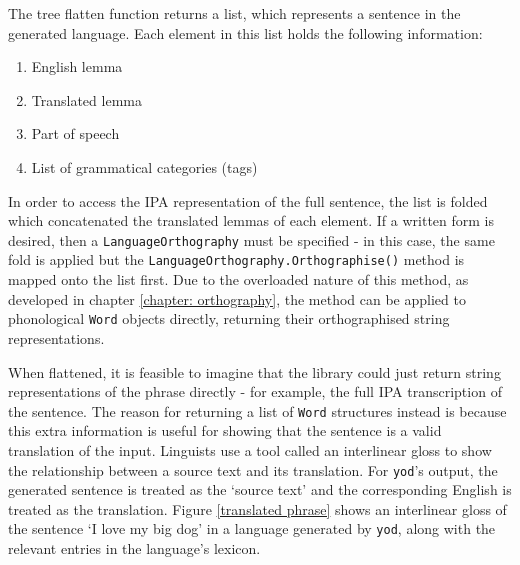 \documentclass{report}
\begin{document}
	The tree flatten function returns a list, which represents a sentence in the generated language. Each element in this list holds the following information:
	\begin{enumerate}
		\item English lemma
		\item Translated lemma
		\item Part of speech
		\item List of grammatical categories (tags)
	\end{enumerate}

	In order to access the IPA representation of the full sentence, the list is folded which concatenated the translated lemmas of each element. If a written form is desired, then a \texttt{LanguageOrthography} must be specified - in this case, the same fold is applied but the \texttt{LanguageOrthography.Orthographise()} method is mapped onto the list first. Due to the overloaded nature of this method, as developed in chapter \ref{chapter: orthography}, the method can be applied to phonological \texttt{Word} objects directly, returning their orthographised string representations.

	When flattened, it is feasible to imagine that the library could just return string representations of the phrase directly - for example, the full IPA transcription of the sentence. The reason for returning a list of \texttt{Word} structures instead is because this extra information is useful for showing that the sentence is a valid translation of the input. Linguists use a tool called an interlinear gloss to show the relationship between a source text and its translation\cite{bickel2008leipzig}. For \texttt{yod}'s output, the generated sentence is treated as the `source text' and the corresponding English is treated as the translation. Figure \ref{translated phrase} shows an interlinear gloss of the sentence `I love my big dog' in a language generated by \texttt{yod}, along with the relevant entries in the language's lexicon. 
	
\end{document}
